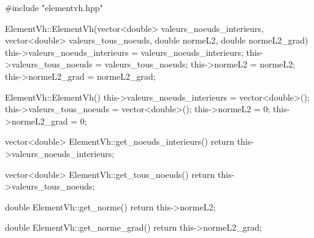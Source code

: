 \begin{codeblock}
#include "elementvh.hpp"

ElementVh::ElementVh(vector<double> valeurs_noeuds_interieurs, vector<double> valeurs_tous_noeuds,
        double normeL2, double normeL2_grad){
    this->valeurs_noeuds_interieurs = valeurs_noeuds_interieurs;
    this->valeurs_tous_noeuds = valeurs_tous_noeuds;
    this->normeL2 = normeL2;
    this->normeL2_grad = normeL2_grad;
}

ElementVh::ElementVh(){
    this->valeurs_noeuds_interieurs = vector<double>();
    this->valeurs_tous_noeuds = vector<double>();
    this->normeL2 = 0;
    this->normeL2_grad = 0;
}

vector<double> ElementVh::get_noeuds_interieurs(){
    return this->valeurs_noeuds_interieurs;
}

vector<double> ElementVh::get_tous_noeuds(){
    return this->valeurs_tous_noeuds;
}

double ElementVh::get_norme(){
    return this->normeL2;
}

double ElementVh::get_norme_grad(){
    return this->normeL2_grad;
}
\end{codeblock}